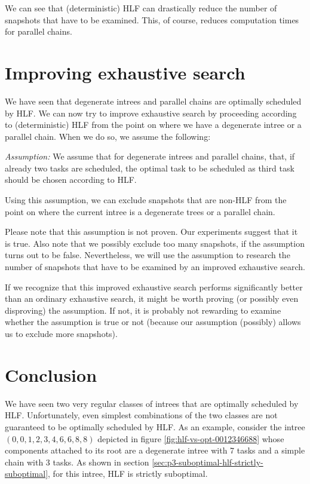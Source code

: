 We can see that (deterministic) HLF can drastically reduce the number of snapshots that have to be examined. This, of course, reduces computation times for parallel chains.

\section{Improving exhaustive search}
\label{sec:improving-exhaustive-search}

We have seen that degenerate intrees and parallel chains are optimally scheduled by HLF. We can now try to improve exhaustive search by proceeding according to (deterministic) HLF from the point on where we have a degenerate intree or a parallel chain. When we do so, we assume the following:

\emph{Assumption:} We assume that for degenerate intrees and parallel chains, that, if already two tasks are scheduled, the optimal task to be scheduled as third task should be chosen according to HLF.

Using this assumption, we can exclude snapshots that are non-HLF from the point on where the current intree is a degenerate trees or a parallel chain.

Please note that this assumption is not proven. Our experiments suggest that it is true. Also note that we possibly exclude too many snapshots, if the assumption turns out to be false. Nevertheless, we will use the assumption to research the number of snapshots that have to be examined by an improved exhaustive search. 

If we recognize that this improved exhaustive search performs significantly better than an ordinary exhaustive search, it might be worth proving (or possibly even disproving) the assumption. If not, it is probably not rewarding to examine whether the assumption is true or not (because our assumption (possibly) allows us to exclude more snapshots).



\section{Conclusion}
\label{sec:properties-schedules-conclusion}

We have seen two very regular classes of intrees that are optimally scheduled by HLF. Unfortunately, even simplest combinations of the two classes are not guaranteed to be optimally scheduled by HLF. As an example, consider the intree $(0,0,1,2,3,4,6,6,8,8)$ depicted in figure \ref{fig:hlf-vs-opt-0012346688} whose components attached to its root are a degenerate intree with 7 tasks and a simple chain with 3 tasks. As shown in section \ref{sec:p3-suboptimal-hlf-strictly-suboptimal}, for this intree, HLF is strictly suboptimal.

